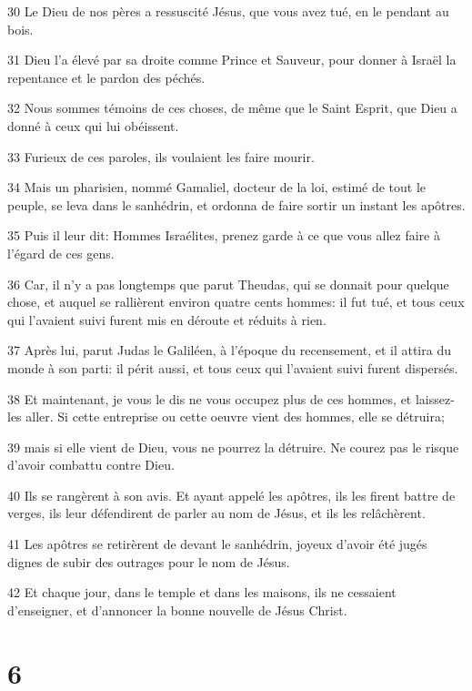 \par 30 Le Dieu de nos pères a ressuscité Jésus, que vous avez tué, en le pendant au bois.
\par 31 Dieu l'a élevé par sa droite comme Prince et Sauveur, pour donner à Israël la repentance et le pardon des péchés.
\par 32 Nous sommes témoins de ces choses, de même que le Saint Esprit, que Dieu a donné à ceux qui lui obéissent.
\par 33 Furieux de ces paroles, ils voulaient les faire mourir.
\par 34 Mais un pharisien, nommé Gamaliel, docteur de la loi, estimé de tout le peuple, se leva dans le sanhédrin, et ordonna de faire sortir un instant les apôtres.
\par 35 Puis il leur dit: Hommes Israélites, prenez garde à ce que vous allez faire à l'égard de ces gens.
\par 36 Car, il n'y a pas longtemps que parut Theudas, qui se donnait pour quelque chose, et auquel se rallièrent environ quatre cents hommes: il fut tué, et tous ceux qui l'avaient suivi furent mis en déroute et réduits à rien.
\par 37 Après lui, parut Judas le Galiléen, à l'époque du recensement, et il attira du monde à son parti: il périt aussi, et tous ceux qui l'avaient suivi furent dispersés.
\par 38 Et maintenant, je vous le dis ne vous occupez plus de ces hommes, et laissez-les aller. Si cette entreprise ou cette oeuvre vient des hommes, elle se détruira;
\par 39 mais si elle vient de Dieu, vous ne pourrez la détruire. Ne courez pas le risque d'avoir combattu contre Dieu.
\par 40 Ils se rangèrent à son avis. Et ayant appelé les apôtres, ils les firent battre de verges, ils leur défendirent de parler au nom de Jésus, et ils les relâchèrent.
\par 41 Les apôtres se retirèrent de devant le sanhédrin, joyeux d'avoir été jugés dignes de subir des outrages pour le nom de Jésus.
\par 42 Et chaque jour, dans le temple et dans les maisons, ils ne cessaient d'enseigner, et d'annoncer la bonne nouvelle de Jésus Christ.

\chapter{6}

